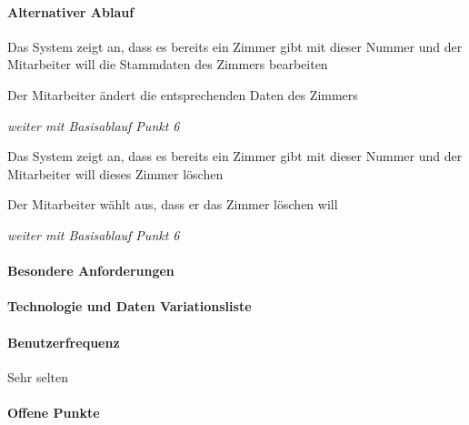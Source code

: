 \paragraph{Alternativer Ablauf}
\begin{longenum}
	\item
	\begin{longenum}
		\item Das System zeigt an, dass es bereits ein Zimmer gibt mit dieser Nummer und der Mitarbeiter will die Stammdaten des Zimmers bearbeiten
		\begin{longenum}
			\item Der Mitarbeiter ändert die entsprechenden Daten des Zimmers 
			\item \emph{weiter mit Basisablauf Punkt 6}
		\end{longenum}
	\end{longenum}
	
	\item
	\item
	\item
	\begin{longenum}
		\item Das System zeigt an, dass es bereits ein \Gls{Zimmer} gibt mit dieser Nummer und der Mitarbeiter will dieses Zimmer löschen
		\begin{longenum}
			\item Der Mitarbeiter wählt aus, dass er das Zimmer löschen will
			\item \emph{weiter mit Basisablauf Punkt 6}
		\end{longenum}
	\end{longenum}
\end{longenum}

\paragraph{Besondere Anforderungen}

\paragraph{Technologie und Daten Variationsliste}

\paragraph{Benutzerfrequenz}
Sehr selten

\paragraph{Offene Punkte}

\newpage
